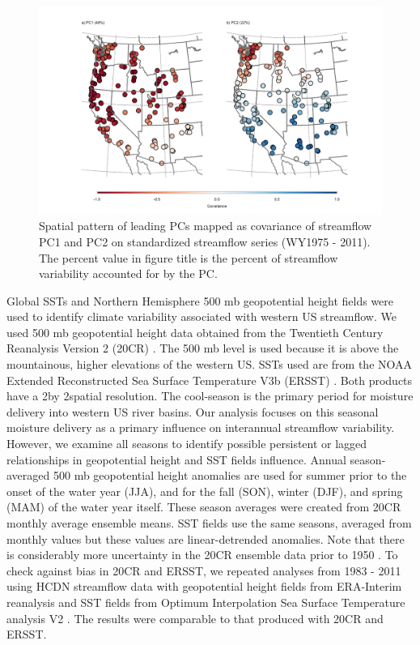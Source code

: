 \documentclass[final, double]{ua-thesis}
\begin{document}
\begin{figure}[ht]
\centering
\centerline{\includegraphics[width=190mm]{p1figures/fig1.pdf}}
\caption{Spatial pattern of leading PCs mapped as covariance of streamflow PC1 and PC2 on standardized streamflow series (WY1975 - 2011). The percent value in figure title is the percent of streamflow variability accounted for by the PC.}
\label{fig:eofs}
\end{figure}

Global SSTs and Northern Hemisphere 500 mb geopotential height fields were used to identify climate variability associated with western US streamflow. We used 500 mb geopotential height data obtained from the Twentieth Century Reanalysis Version 2 (20CR) \citep{1compo_twentieth_2011}. The 500 mb level is used because it is above the mountainous, higher elevations of the western US. SSTs used are from the NOAA Extended Reconstructed Sea Surface Temperature V3b (ERSST) \citep{1smith_improvements_2008}. Both products have a  2\textdegree by 2\textdegree spatial resolution. The cool-season is the primary period for moisture delivery into western US river basins. Our analysis focuses on this seasonal moisture delivery as a primary influence on interannual streamflow variability. However, we examine all seasons to identify possible persistent or lagged relationships in geopotential height and SST fields influence. Annual season-averaged 500 mb geopotential height anomalies are used for summer prior to the onset of the water year (JJA), and for the fall (SON), winter (DJF), and spring (MAM) of the water year itself. These season averages were created from 20CR monthly average ensemble means. SST fields use the same seasons, averaged from monthly values but these values are linear-detrended anomalies. Note that there is considerably more uncertainty in the 20CR ensemble data prior to 1950 \citep{1compo_twentieth_2011}. To check against bias in 20CR and ERSST, we repeated analyses from 1983 - 2011 using HCDN streamflow data with geopotential height fields from ERA-Interim reanalysis \citep{1dee_era-interim_2011, 1european_centre_for_medium-range_weather_forecasts_era-interim_2012} and SST fields from Optimum Interpolation Sea Surface Temperature analysis V2 \citep{1reynolds_daily_2007}. The results were comparable to that produced with 20CR and ERSST.
\end{document}

